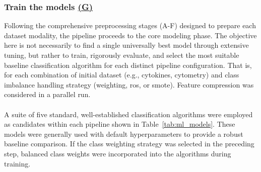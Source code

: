 \documentclass[12pt,a4paper]{report}
\begin{document}
\subsubsection*{Train the models \hyperref[fig:pipeline-1]{(G)}}
\noindent
Following the comprehensive preprocessing stages (A-F) designed to prepare each dataset modality, the pipeline proceeds to the core modeling phase. The objective here is not necessarily to find a single universally best model through extensive tuning, but rather to train, rigorously evaluate, and select the most suitable baseline classification algorithm for each distinct pipeline configuration. That is, for each combination of initial dataset (e.g., cytokines, cytometry) and class imbalance handling strategy (weighting, \gls{ros}, or \gls{smote}). Feature compression was considered in a parallel run.\\
\\
A suite of five standard, well-established classification algorithms were employed as candidates within each pipeline shown in Table~\ref{tab:ml_models}. These models were generally used with default hyperparameters to provide a robust baseline comparison. If the class weighting strategy was selected in the preceding step, balanced class weights were incorporated into the algorithms during training.\\
\begin{table}[h!]
    \centering
    \caption[Machine Learning Models Used]{Machine Learning Models Used and their Configurations}
    \label{tab:ml_models}
\end{table}
\end{document}
